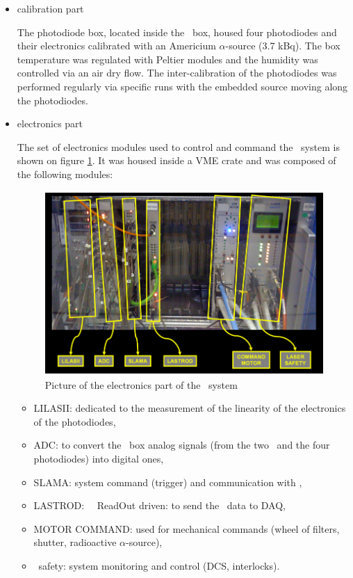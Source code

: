 \begin{itemize}
\item calibration part 
	
	The photodiode box, located inside the \las~box, housed four photodiodes and their electronics calibrated with an Americium $\alpha$-source (3.7 kBq). The box temperature was regulated with Peltier modules and the humidity was controlled via an air dry flow. The inter-calibration of the photodiodes was performed regularly via specific runs with the embedded source moving along the photodiodes. 
	
\item electronics part 
	
	The set of electronics modules used to control and command the \lasa~system is shown on figure \ref{fig:lasaelectronics}. It was housed inside a VME crate and was composed of the following modules:
	\begin{figure}[htbp]
			\centering
			\includegraphics[height=7cm]{figures/Electronics.png}
			\caption{Picture of the electronics part of the \lasi~system}\label{fig:lasaelectronics}
		\end{figure}	
		
	\begin{itemize}
	\item {\sc LILASII}: dedicated to the measurement of the linearity of the electronics of the photodiodes,
	\item {\sc ADC}: to convert the \las~box analog signals (from the two \pmts~and the four photodiodes) into digital ones,
	\item {\sc SLAMA}: system command (trigger) and communication with \atlas,
	\item {\sc LASTROD}: \las~\tilecal~ReadOut driven: to send the \las~data to \atlas DAQ,
	\item {\sc MOTOR COMMAND}: used for mechanical commands (wheel of filters, shutter, radioactive $\alpha$-source),
	\item \las~safety: system monitoring and control (DCS, interlocks).
	\end{itemize}
	
\end{itemize}



